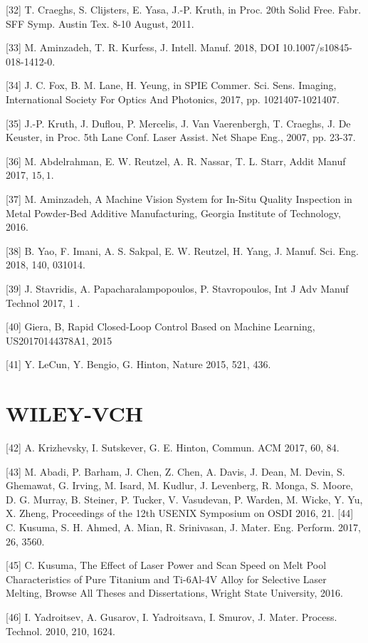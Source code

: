 \documentclass[10pt]{article}
\begin{document}
[32] T. Craeghs, S. Clijsters, E. Yasa, J.-P. Kruth, in Proc. 20th Solid Free. Fabr. SFF Symp. Austin Tex. 8-10 August, 2011.

[33] M. Aminzadeh, T. R. Kurfess, J. Intell. Manuf. 2018, DOI 10.1007/s10845-018-1412-0.

[34] J. C. Fox, B. M. Lane, H. Yeung, in SPIE Commer. Sci. Sens. Imaging, International Society For Optics And Photonics, 2017, pp. 1021407-1021407.

[35] J.-P. Kruth, J. Duflou, P. Mercelis, J. Van Vaerenbergh, T. Craeghs, J. De Keuster, in Proc. 5th Lane Conf. Laser Assist. Net Shape Eng., 2007, pp. 23-37.

[36] M. Abdelrahman, E. W. Reutzel, A. R. Nassar, T. L. Starr, Addit Manuf 2017, $15,1$.

[37] M. Aminzadeh, A Machine Vision System for In-Situ Quality Inspection in Metal Powder-Bed Additive Manufacturing, Georgia Institute of Technology, 2016.

[38] B. Yao, F. Imani, A. S. Sakpal, E. W. Reutzel, H. Yang, J. Manuf. Sci. Eng. 2018, 140, 031014.

[39] J. Stavridis, A. Papacharalampopoulos, P. Stavropoulos, Int J Adv Manuf Technol 2017, 1 .

[40] Giera, B, Rapid Closed-Loop Control Based on Machine Learning, US20170144378A1, 2015

[41] Y. LeCun, Y. Bengio, G. Hinton, Nature 2015, 521, 436.

\section*{WILEY-VCH}
[42] A. Krizhevsky, I. Sutskever, G. E. Hinton, Commun. ACM 2017, 60, 84.

[43] M. Abadi, P. Barham, J. Chen, Z. Chen, A. Davis, J. Dean, M. Devin, S. Ghemawat, G. Irving, M. Isard, M. Kudlur, J. Levenberg, R. Monga, S. Moore, D. G. Murray, B. Steiner, P. Tucker, V. Vasudevan, P. Warden, M. Wicke, Y. Yu, X. Zheng, Proceedings of the 12th USENIX Symposium on OSDI 2016, 21. [44] C. Kusuma, S. H. Ahmed, A. Mian, R. Srinivasan, J. Mater. Eng. Perform. 2017, 26, 3560.

[45] C. Kusuma, The Effect of Laser Power and Scan Speed on Melt Pool Characteristics of Pure Titanium and Ti-6Al-4V Alloy for Selective Laser Melting, Browse All Theses and Dissertations, Wright State University, 2016.

[46] I. Yadroitsev, A. Gusarov, I. Yadroitsava, I. Smurov, J. Mater. Process. Technol. 2010, 210, 1624.
\end{document}
